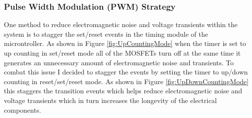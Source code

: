 \documentclass{article}
\begin{document}
			\subsubsection{Pulse Width Modulation (PWM) Strategy}
			One method to reduce electromagnetic noise and voltage transients within the system is to stagger the set/reset events in the timing module of the microntroller.  As shown in Figure \ref{fig:UpCountingMode} when the timer is set to up counting in set/reset mode all of the MOSFETs turn off at the same time it generates an unnecessary amount of electromagnetic noise and transients.  To combat this issue I decided to stagger the events by setting the timer to up/down counting in reset/set/reset mode.  As shown in Figure \ref{fig:UpDownCountingMode} this staggers the transition events which helps reduce electromagnetic noise and voltage transients  which in turn increases the longevity of the electrical components.
			
\end{document}
